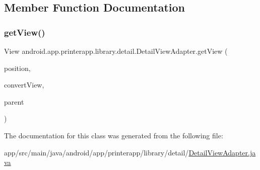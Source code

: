 \subsection{Member Function Documentation}
\mbox{\label{classandroid_1_1app_1_1printerapp_1_1library_1_1detail_1_1_detail_view_adapter_ade238ff43ea8b4c4c145cf823e4f0493}} 
\subsubsection{\texorpdfstring{get\+View()}{getView()}}
{\footnotesize\ttfamily View android.\+app.\+printerapp.\+library.\+detail.\+Detail\+View\+Adapter.\+get\+View (\begin{DoxyParamCaption}\item[{int}]{position,  }\item[{View}]{convert\+View,  }\item[{View\+Group}]{parent }\end{DoxyParamCaption})}



The documentation for this class was generated from the following file\+:\begin{DoxyCompactItemize}
\item 
app/src/main/java/android/app/printerapp/library/detail/\hyperlink{_detail_view_adapter_8java}{Detail\+View\+Adapter.\+java}\end{DoxyCompactItemize}
